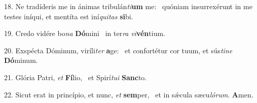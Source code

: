 18. Ne tradíderis me in ánimas tribulán\textit{ti}\textbf{um} me: \ast\  quóniam insurrexérunt in me testes iníqui, et mentíta est iní\textit{qui}\textit{tas} \textbf{si}bi.\

19. Credo vidére bo\textit{na} \textbf{Dó}mini \ast\  in ter\textit{ra} \textit{vi}\textbf{vén}tium.\

20. Exspécta Dóminum, viríli\textit{ter} \textbf{a}ge: \ast\  et confortétur cor tuum, et sús\textit{ti}\textit{ne} \textbf{Dó}minum.\

21. Glória Patri, \textit{et} \textbf{Fí}lio, \ast\  et Spirí\textit{tu}\textit{i} \textbf{Sanc}to.\

22. Sicut erat in princípio, et nunc, \textit{et} \textbf{sem}per, \ast\  et in sǽcula sæcu\textit{ló}\textit{rum}. \textbf{A}men.\

